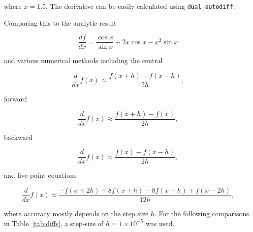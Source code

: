 \documentclass[11pt,a4paper]{article}
\begin{document}
where $x=1.5$. The derivative can be easily calculated using \texttt{dual\_autodiff}:

Comparing this to the analytic result

\begin{equation}
    \frac{df}{dx} = \frac{\cos{x}}{\sin{x}} + 2 x \cos{x} - x^2 \sin{x} 
\end{equation}

and various numerical methods including the central

\begin{equation}
    \frac{d}{dx} f(x) \approx \frac{f(x+h) - f(x-h)}{2h},
\end{equation}

forward

\begin{equation}
    \frac{d}{dx} f(x) \approx \frac{f(x+h) - f(x)}{2h},
\end{equation}

backward

\begin{equation}
    \frac{d}{dx} f(x) \approx \frac{f(x) - f(x-h)}{2h},
\end{equation}

and five-point equations

\begin{equation}
    \frac{d}{dx} f(x) \approx \frac{-f(x+2h) + 8 f(x+h) - 8 f(x-h) + f(x-2h)}{12h},
\end{equation}

where accuracy mostly depends on the step size $h$. For the following comparisons in Table~\ref{tab:diffs}, a step-size of $h=1 \times 10^{-5}$ was used.
\end{document}

